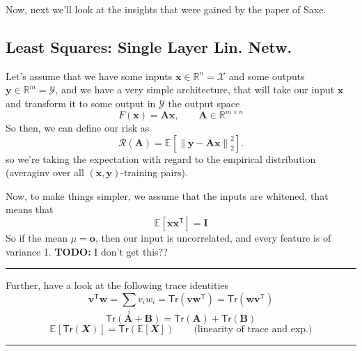 \documentclass[a2paper,8pt]{extarticle}
\newcommand{\R}{\mathbb{R}}
\newcommand{\cR}{\mathcal{R}}
\newcommand{\cX}{\mathcal{X}}
\newcommand{\cY}{\mathcal{Y}}
\newcommand{\norm}[1]{\left\lVert #1 \right\rVert}
\newcommand{\Tr}[1]{\mathsf{Tr}\left( #1 \right)}
\newcommand{\Exp}[2][]{{\mathbb{E}_{#1}}\left[ #2
\right]}
\newcommand{\rvX}{\mathbfit{X}}
\newcommand*{\T}{\mathsf{T}}
\newcommand{\mat}[1]{\mathbf{#1}}
\renewcommand{\vec}[1]{\mathbf{#1}}
\newcommand{\vo}{\vec{o}}
\newcommand{\vv}{\vec{v}}
\newcommand{\vw}{\vec{w}}
\newcommand{\vx}{\vec{x}}
\newcommand{\vy}{\vec{y}}
\newcommand{\MA}{\mat{A}}
\newcommand{\MB}{\mat{B}}
\newcommand{\MI}{\mat{I}}
\newcommand{\todo}[1]{\textbf{TODO:} #1}
\newcommand{\todo}[1]{%
}
\newcommand{\sep}{\vspace{0pt}\noindent\hrule\vspace{0pt}}
\newcommand{\ssep}{\hdashrule[1.1ex]{\linewidth}{0.1pt}{0.3mm}\vspace{-6pt}}
\newcommand{\sep}{\vspace{5pt}\noindent\hrule\vspace{5pt}}
\newcommand{\ssep}{\hdashrule[1.1ex]{\linewidth}{0.1pt}{0.3mm}\vspace{-3pt}}
\begin{document}
\begin{landscape}
\begin{multicols*}{7}
Now, next we'll look at the insights that were gained by the paper of Saxe.

\subsection{Least Squares: Single Layer Lin. Netw.}

Let's assume that we have some inputs $\vx\in\R^n=\cX$ and some outputs
$\vy\in\R^m=\cY$, and we have a very simple architecture, that will take our
input $\vx$ and transform it to some output in $\cY$ the output space
\[
F(\vx)=\MA\vx, \qquad \MA\in\R^{m\times n}
\]
So then, we can define our risk as
\[
\cR(\MA)=\Exp{\norm{\vy-\MA\vx}_2^2}.
\]
so we're taking the expectation with regard to the empirical distribution
(averaginv over all $(\vx,\vy)$-training pairs).

\ssep

Now, to make things simpler, we assume that the inputs are whitened, that means
that
\[
\Exp{\vx\vx^\T}=\MI
\]
So if the mean $\mu=\vo$, then our input is uncorrelated, and every feature is
of variance 1.
\todo{I don't get this??}

\sep

Further, have a look at the following trace identities
\[
\vv^\T\vw=
\sum_{i}v_iw_i
=
\Tr{\vv\vw^\T}
=
\Tr{\vw\vv^\T}
\]
\[
\Tr{\MA+\MB}=\Tr{\MA} + \Tr{\MB}
\]
\[
\Exp{\Tr{\rvX}}=\Tr{\Exp{\rvX}} \qquad\text{(linearity of trace and exp.)}
\]

\sep


\end{multicols*}
\end{landscape}
\end{document}
